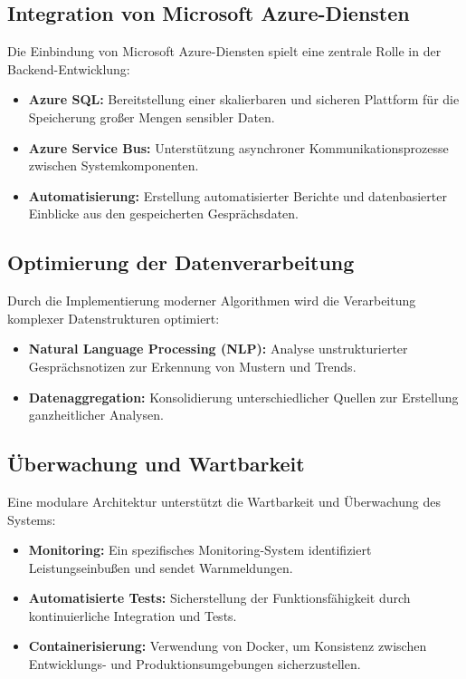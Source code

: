 \subsection{Integration von Microsoft Azure-Diensten}
Die Einbindung von Microsoft Azure-Diensten spielt eine zentrale Rolle in der Backend-Entwicklung:
\begin{itemize}
    \item \textbf{Azure SQL:} Bereitstellung einer skalierbaren und sicheren Plattform für die Speicherung großer Mengen sensibler Daten.
    \item \textbf{Azure Service Bus:} Unterstützung asynchroner Kommunikationsprozesse zwischen Systemkomponenten.
    \item \textbf{Automatisierung:} Erstellung automatisierter Berichte und datenbasierter Einblicke aus den gespeicherten Gesprächsdaten.
\end{itemize}

\subsection{Optimierung der Datenverarbeitung}
Durch die Implementierung moderner Algorithmen wird die Verarbeitung komplexer Datenstrukturen optimiert:
\begin{itemize}
    \item \textbf{Natural Language Processing (NLP):} Analyse unstrukturierter Gesprächsnotizen zur Erkennung von Mustern und Trends.
    \item \textbf{Datenaggregation:} Konsolidierung unterschiedlicher Quellen zur Erstellung ganzheitlicher Analysen.
\end{itemize}

\subsection{Überwachung und Wartbarkeit}
Eine modulare Architektur unterstützt die Wartbarkeit und Überwachung des Systems:
\begin{itemize}
    \item \textbf{Monitoring:} Ein spezifisches Monitoring-System identifiziert Leistungseinbußen und sendet Warnmeldungen.
    \item \textbf{Automatisierte Tests:} Sicherstellung der Funktionsfähigkeit durch kontinuierliche Integration und Tests.
    \item \textbf{Containerisierung:} Verwendung von Docker, um Konsistenz zwischen Entwicklungs- und Produktionsumgebungen sicherzustellen.
\end{itemize}

